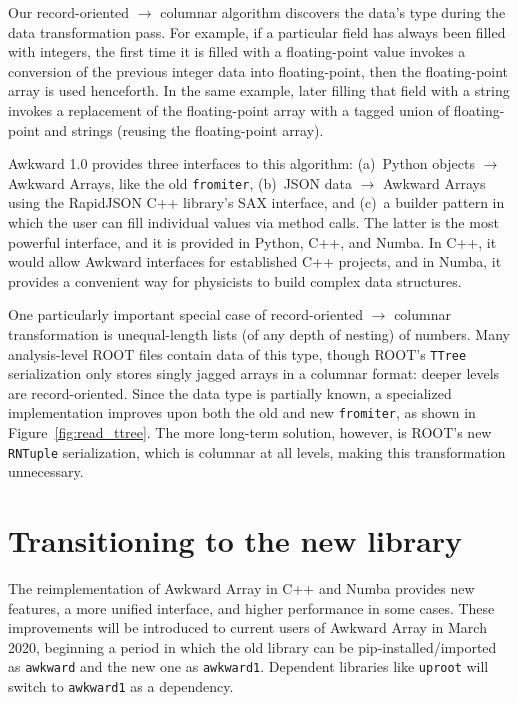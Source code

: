 \documentclass{webofc}
\begin{document}
Our record-oriented $\to$ columnar algorithm discovers the data's type during the data transformation pass. For example, if a particular field has always been filled with integers, the first time it is filled with a floating-point value invokes a conversion of the previous integer data into floating-point, then the floating-point array is used henceforth. In the same example, later filling that field with a string invokes a replacement of the floating-point array with a tagged union of floating-point and strings (reusing the floating-point array).

Awkward 1.0 provides three interfaces to this algorithm: (a)~Python objects $\to$ Awkward Arrays, like the old \texttt{fromiter}, (b)~JSON data $\to$ Awkward Arrays using the RapidJSON C++ library's SAX interface, and (c)~a builder pattern in which the user can fill individual values via method calls. The latter is the most powerful interface, and it is provided in Python, C++, and Numba. In C++, it would allow Awkward interfaces for established C++ projects, and in Numba, it provides a convenient way for physicists to build complex data structures.

One particularly important special case of record-oriented $\to$ columnar transformation is unequal-length lists (of any depth of nesting) of numbers. Many analysis-level ROOT files contain data of this type, though ROOT's \texttt{TTree} serialization only stores singly jagged arrays in a columnar format: deeper levels are record-oriented. Since the data type is partially known, a specialized implementation improves upon both the old and new \texttt{fromiter}, as shown in Figure~\ref{fig:read_ttree}. The more long-term solution, however, is ROOT's new \texttt{RNTuple} serialization, which is columnar at all levels, making this transformation unnecessary.


\section{Transitioning to the new library}

The reimplementation of Awkward Array in C++ and Numba provides new features, a more unified interface, and higher performance in some cases. These improvements will be introduced to current users of Awkward Array in March 2020, beginning a period in which the old library can be pip-installed/imported as \texttt{awkward} and the new one as \texttt{awkward1}. Dependent libraries like \texttt{uproot} will switch to \texttt{awkward1} as a dependency.
\end{document}
